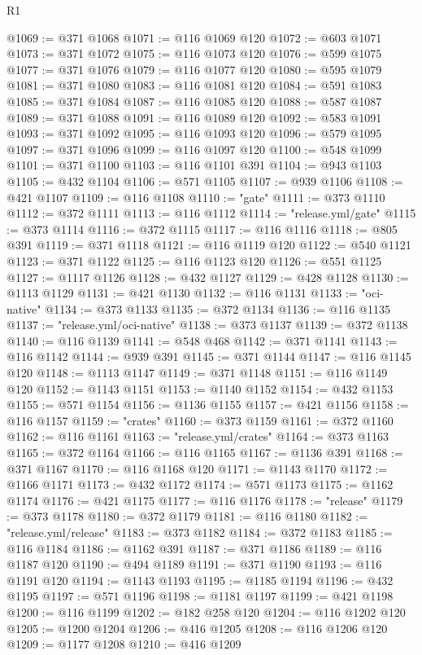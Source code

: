 \begin{lexlean}{R1}
\begin{coremodule}
@1069 := @371 @1068
@1071 := @116 @1069 @120
@1072 := @603 @1071
@1073 := @371 @1072
@1075 := @116 @1073 @120
@1076 := @599 @1075
@1077 := @371 @1076
@1079 := @116 @1077 @120
@1080 := @595 @1079
@1081 := @371 @1080
@1083 := @116 @1081 @120
@1084 := @591 @1083
@1085 := @371 @1084
@1087 := @116 @1085 @120
@1088 := @587 @1087
@1089 := @371 @1088
@1091 := @116 @1089 @120
@1092 := @583 @1091
@1093 := @371 @1092
@1095 := @116 @1093 @120
@1096 := @579 @1095
@1097 := @371 @1096
@1099 := @116 @1097 @120
@1100 := @548 @1099
@1101 := @371 @1100
@1103 := @116 @1101 @391
@1104 := @943 @1103
@1105 := @432 @1104
@1106 := @571 @1105
@1107 := @939 @1106
@1108 := @421 @1107
@1109 := @116 @1108
@1110 := "gate"
@1111 := @373 @1110
@1112 := @372 @1111
@1113 := @116 @1112
@1114 := "release.yml/gate"
@1115 := @373 @1114
@1116 := @372 @1115
@1117 := @116 @1116
@1118 := @805 @391
@1119 := @371 @1118
@1121 := @116 @1119 @120
@1122 := @540 @1121
@1123 := @371 @1122
@1125 := @116 @1123 @120
@1126 := @551 @1125
@1127 := @1117 @1126
@1128 := @432 @1127
@1129 := @428 @1128
@1130 := @1113 @1129
@1131 := @421 @1130
@1132 := @116 @1131
@1133 := "oci-native"
@1134 := @373 @1133
@1135 := @372 @1134
@1136 := @116 @1135
@1137 := "release.yml/oci-native"
@1138 := @373 @1137
@1139 := @372 @1138
@1140 := @116 @1139
@1141 := @548 @468
@1142 := @371 @1141
@1143 := @116 @1142
@1144 := @939 @391
@1145 := @371 @1144
@1147 := @116 @1145 @120
@1148 := @1113 @1147
@1149 := @371 @1148
@1151 := @116 @1149 @120
@1152 := @1143 @1151
@1153 := @1140 @1152
@1154 := @432 @1153
@1155 := @571 @1154
@1156 := @1136 @1155
@1157 := @421 @1156
@1158 := @116 @1157
@1159 := "crates"
@1160 := @373 @1159
@1161 := @372 @1160
@1162 := @116 @1161
@1163 := "release.yml/crates"
@1164 := @373 @1163
@1165 := @372 @1164
@1166 := @116 @1165
@1167 := @1136 @391
@1168 := @371 @1167
@1170 := @116 @1168 @120
@1171 := @1143 @1170
@1172 := @1166 @1171
@1173 := @432 @1172
@1174 := @571 @1173
@1175 := @1162 @1174
@1176 := @421 @1175
@1177 := @116 @1176
@1178 := "release"
@1179 := @373 @1178
@1180 := @372 @1179
@1181 := @116 @1180
@1182 := "release.yml/release"
@1183 := @373 @1182
@1184 := @372 @1183
@1185 := @116 @1184
@1186 := @1162 @391
@1187 := @371 @1186
@1189 := @116 @1187 @120
@1190 := @494 @1189
@1191 := @371 @1190
@1193 := @116 @1191 @120
@1194 := @1143 @1193
@1195 := @1185 @1194
@1196 := @432 @1195
@1197 := @571 @1196
@1198 := @1181 @1197
@1199 := @421 @1198
@1200 := @116 @1199
@1202 := @182 @258 @120
@1204 := @116 @1202 @120
@1205 := @1200 @1204
@1206 := @416 @1205
@1208 := @116 @1206 @120
@1209 := @1177 @1208
@1210 := @416 @1209

\end{coremodule}
\end{lexlean}
